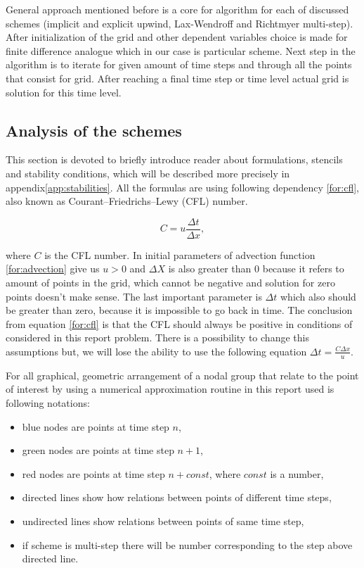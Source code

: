 	General approach mentioned before is a core for algorithm for each of discussed schemes (implicit and explicit upwind, Lax-Wendroff and Richtmyer multi-step). After initialization of the grid and other dependent variables choice is made for finite difference analogue which in our case is particular scheme. Next step in the algorithm is to iterate for given amount of time steps and through all the points that consist for grid. After reaching a final time step or time level actual grid is solution for this time level.
	
	\subsection{Analysis of the schemes} \label{sec:analysis}
		This section is devoted to briefly introduce reader about formulations, stencils and stability conditions, which will be described more precisely in appendix\ref{app:stabilities}. All the formulas are using following dependency \ref{for:cfl}, also known as Courant–Friedrichs–Lewy (CFL) number.
		
		\begin{equation}
			\label{for:cfl}
			C = u \frac{\Delta t}{\Delta x},
		\end{equation} 
		
		where $C$ is the CFL number. In initial parameters of advection function \ref{for:advection} give us $u > 0$ and $\Delta X$ is also greater than $0$ because it refers to amount of points in the grid, which cannot be negative and solution for zero points doesn't make sense. The last important parameter is $\Delta t$ which also should be greater than zero, because it is impossible to go back in time. The conclusion from equation \ref{for:cfl} is that the CFL should always be positive in conditions of considered in this report problem. There is a possibility to change this assumptions but, we will lose the ability to use the following equation $\Delta t = \frac{C\Delta x}{u}$.
		
		For all graphical, geometric arrangement of a nodal group that relate to the point of interest by using a numerical approximation routine in this report used is following notations:
		
		\begin{itemize}
			\item blue nodes are points at time step $n$,
			\item green nodes are points at time step $n+1$,
			\item red nodes are points at time step $n+const$, where $const$ is a number,
			\item directed lines show how relations between points of different time steps,
			\item undirected lines show relations between points of same time step,
			\item if scheme is multi-step there will be number corresponding to the step above directed line.
		\end{itemize}
		
